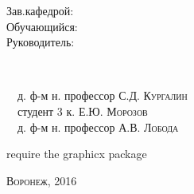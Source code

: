 \begin{titlepage}
\begin{minipage}{0.18\textwidth}
\begin{flushleft}
\textrm{Зав.кафедрой:}\\[0.2cm]
\textrm{Обучающийся:}\\[0.2cm]
\textrm{Руководитель:}\\
\end{flushleft}
\end{minipage}
~\begin{minipage}{0.7\textwidth}
\begin{flushright}
~\hrulefill~д. ф-м н. профессор \textsc{С.Д. Кургалин} \\ [0.2cm]
~\hrulefill~студент 3 к. \textsc{Е.Ю. Морозов} \\ [0.2cm]
~\hrulefill~д. ф-м н. профессор \textsc{А.В. Лобода} \\ [0.2cm]
\end{flushright}
\end{minipage}




require the graphicx package
 

\vfill %
\textsc{Воронеж}, 2016
\end{titlepage}

\null\vspace{\fill}


